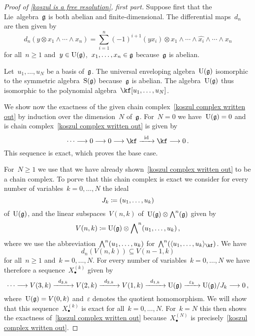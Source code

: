 \begin{proof}[Proof of \cref{koszul is a free resolution}, first part]
	Suppose first that the Lie~algebra~$\mathfrak{g}$ is both abelian and finite-dimensional.
	The differential maps~$d_n$ are then given by
	\[
		d_n( y \otimes x_1 \wedge \dotsb \wedge x_n )
		=
		\sum_{i=1}^n
		(-1)^{i+1}
		(y x_i) \otimes x_1 \wedge \dotsb \wedge \widehat{x_i} \wedge \dotsb \wedge x_n
	\]
	for all~$n \geq 1$ and~$y \in \operatorname{U}(\mathfrak{g})$,~$x_1, \dotsc, x_n \in \mathfrak{g}$ because~$\mathfrak{g}$ is abelian.

	Let~$u_1, \dotsc, u_N$ be a basis of~$\mathfrak{g}$.
	The universal enveloping algebra~$\operatorname{U}(\mathfrak{g})$ isomorphic to the symmetric algebra~$\operatorname{S}(\mathfrak{g})$ because~$\mathfrak{g}$ is abelian.
	The algebra~$\operatorname{U}(\mathfrak{g})$ thus isomorphic to the polynomial algebra~$\kf[u_1, \dotsc, u_N]$.

	We show now the exactness of the given chain complex~\eqref{koszul complex written out} by induction over the dimension~$N$ of~$\mathfrak{g}$.
	For~$N = 0$ we have~$\operatorname{U}(\mathfrak{g}) = 0$ and is chain complex~\eqref{koszul complex written out} is given by
	\[
		\dotsb
		\to
		0
		\to
		0
		\to
		\kf
		\xto{\id}
		\kf
		\to
		0 \,.
	\]
	This sequence is exact, which proves the base case.

	For~$N \geq 1$ we use that we have already shown~\eqref{koszul complex written out} to be a chain complex.
	To porve that this chain complex is exact we consider for every number of variables~$k = 0, \dotsc, N$ the ideal
	\[
		J_k
		\coloneqq
		\lparen u_1, \dotsc, u_k\rparen
	\]
	of~$\operatorname{U}(\mathfrak{g})$, and the linear subspaces~$V(n,k)$ of~$\operatorname{U}(\mathfrak{g}) \otimes \operatorname{\bigwedge}^n(\mathfrak{g})$ given by
	\[
		V(n,k)
		\coloneqq
		\operatorname{U}(\mathfrak{g}) \otimes \operatorname{\bigwedge}^n(u_1, \dotsc, u_k)  \,,
	\]
	where we use the abbreviation~$\operatorname{\bigwedge}^n(u_1, \dotsc, u_k)$ for~$\Exterior^n( \gen{u_1, \dotsc, u_k}_{\kf} )$.
	We have
	\[
		d_n( V(n, k) )
		\subseteq
		V(n-1, k)
	\]
	for all~$n \geq 1$ and~$k = 0, \dotsc, N$.
	For every number of variables~$k = 0, \dotsc, N$ we have therefore a sequence~$X^{(k)}_\bullet$ given by
	\[
		\dotsb
		\to
		V(3,k)
		\xto{d_{3,k}}
		V(2,k)
		\xto{d_{2,k}}
		V(1,k)
		\xto{d_{1,k}}
		\Univ(\glie)
		\xto{\varepsilon_k}
		\Univ(\glie) / J_k
		\to
		0 \,,
	\]
	where~$\operatorname{U}(\mathfrak{g}) = V(0,k)$ and~$\varepsilon$ denotes the quotient homomorphism.
	We will show that this sequence~$X^{(k)}_\bullet$ is exact for all~$k = 0, \dotsc, N$.
	For~$k = N$ this then shows the exactness of~\eqref{koszul complex written out} because~$X^{(N)}_\bullet$ is precisely~\eqref{koszul complex written out}.


\end{proof}
